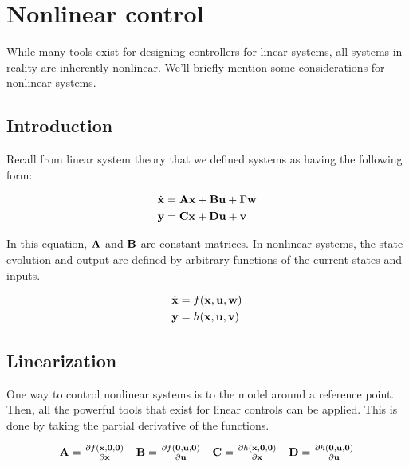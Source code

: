 
\chapter{Nonlinear control} \label{ch:nonlinear-control}

While many tools exist for designing controllers for linear \glspl{system}, all
\glspl{system} in reality are inherently nonlinear. We'll briefly mention some
considerations for nonlinear \glspl{system}.

\section{Introduction}

Recall from linear \gls{system} theory that we defined \glspl{system} as having
the following form:

\begin{align*}
  \dot{\mathbf{x}} &= \mathbf{A}\mathbf{x} + \mathbf{B}\mathbf{u} + \mathbf{\Gamma}\mathbf{w} \\
  \mathbf{y} &= \mathbf{C}\mathbf{x} + \mathbf{D}\mathbf{u} + \mathbf{v}
\end{align*}

In this equation, $\mathbf{A}$ and $\mathbf{B}$ are constant matrices. In nonlinear
\glspl{system}, the \gls{state} evolution and \gls{output} are defined by
arbitrary functions of the current \glspl{state} and \glspl{input}.

\begin{align*}
  \dot{\mathbf{x}} &= f(\mathbf{x}, \mathbf{u}, \mathbf{w}) \\
  \mathbf{y} &= h(\mathbf{x}, \mathbf{u}, \mathbf{v})
\end{align*}

\section{Linearization}

One way to control nonlinear \glspl{system} is to
 the \gls{model} around a reference point.
Then, all the powerful tools that exist for linear controls can be applied. This
is done by taking the partial derivative of the functions.

\begin{align*}
  \begin{array}{cccc}
    \mathbf{A} = \frac{\partial f(\mathbf{x}, \mathbf{0}, \mathbf{0})}{\partial \mathbf{x}} &
    \mathbf{B} = \frac{\partial f(\mathbf{0}, \mathbf{u}, \mathbf{0})}{\partial \mathbf{u}} &
    \mathbf{C} = \frac{\partial h(\mathbf{x}, \mathbf{0}, \mathbf{0})}{\partial \mathbf{x}} &
    \mathbf{D} = \frac{\partial h(\mathbf{0}, \mathbf{u}, \mathbf{0})}{\partial \mathbf{u}}
  \end{array}
\end{align*}

